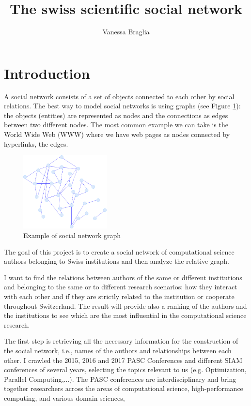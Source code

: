 \documentclass[]{usiinfbachelorproject}
\author{Vanessa Braglia}
\title{The swiss scientific social network}
\begin{document}
\newpage
\tableofcontents
\newpage

\section{Introduction} \label{sec:intro} 

A social network consists of a set of objects connected to each other by social relations. The best way to model social networks is using graphs (see Figure \ref{fig:socialnetwork}): the objects (entities) are represented as nodes and the connections as edges between two different nodes. The most common example we can take is the World Wide Web (WWW) where we have web pages as nodes connected by hyperlinks, the edges.

\begin{figure}[ht]
	\centering
	\includegraphics[height=4cm]{img/graph3.png}
	\caption{Example of social network graph}
	\label{fig:socialnetwork}
\end{figure}

The goal of this project is to create a social network of computational science authors belonging to Swiss institutions and then analyze the relative graph.

I want to find the relations between authors of the same or different institutions and belonging to the same or to different research scenarios: how they interact with each other and if they are strictly related to the institution or cooperate throughout Switzerland. The result will provide also a ranking of the authors and the institutions to see which are the most influential in the computational science research.

The first step is retrieving all the necessary information for the construction of the social network, i.e., names of the authors and relationships between each other. I crawled the 2015, 2016 and 2017 PASC Conferences and different SIAM conferences of several years, selecting the topics relevant to us (e.g. Optimization, Parallel Computing,...). The PASC conferences are interdisciplinary and bring together researchers across the areas of computational science, high-performance computing, and various domain sciences, 
\end{document}
